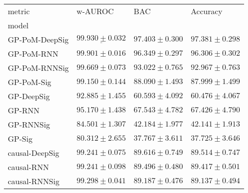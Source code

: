 \begin{tabular}{llll}
\toprule
metric &                                        w-AUROC &                                            BAC &                                       Accuracy \\
model          &                                                &                                                &                                                \\
\midrule
GP-PoM-DeepSig &            $  \underline{ 99.930 \pm 0.032 } $ &               $  \mathbf{ 97.403 \pm 0.300 } $ &               $  \mathbf{ 97.381 \pm 0.298 } $ \\
GP-PoM-RNN     &                           $ 99.901 \pm 0.016 $ &                           $ 96.349 \pm 0.297 $ &                           $ 96.306 \pm 0.302 $ \\
GP-PoM-RNNSig  &                           $ 99.669 \pm 0.073 $ &                           $ 93.022 \pm 0.765 $ &                           $ 92.967 \pm 0.763 $ \\
GP-PoM-Sig     &                           $ 99.150 \pm 0.144 $ &                           $ 88.090 \pm 1.493 $ &                           $ 87.999 \pm 1.499 $ \\
GP-DeepSig     &                           $ 92.885 \pm 1.455 $ &                           $ 60.593 \pm 4.092 $ &                           $ 60.476 \pm 4.067 $ \\
GP-RNN         &                           $ 95.170 \pm 1.438 $ &                           $ 67.543 \pm 4.782 $ &                           $ 67.426 \pm 4.790 $ \\
GP-RNNSig      &                           $ 84.501 \pm 1.307 $ &                           $ 42.184 \pm 1.977 $ &                           $ 42.141 \pm 1.913 $ \\
GP-Sig         &                           $ 80.312 \pm 2.655 $ &                           $ 37.767 \pm 3.611 $ &                           $ 37.725 \pm 3.646 $ \\
causal-DeepSig &                           $ 99.241 \pm 0.075 $ &                           $ 89.616 \pm 0.749 $ &                           $ 89.514 \pm 0.747 $ \\
causal-RNN     &                           $ 99.241 \pm 0.098 $ &                           $ 89.496 \pm 0.480 $ &                           $ 89.417 \pm 0.501 $ \\
causal-RNNSig  &                           $ 99.298 \pm 0.041 $ &                           $ 89.187 \pm 0.476 $ &                           $ 89.137 \pm 0.494 $ \\

\end{tabular}
